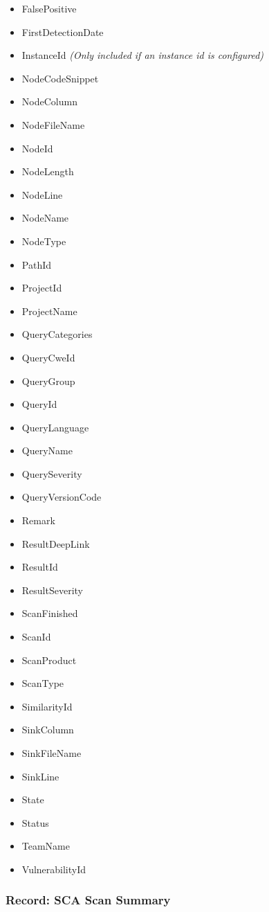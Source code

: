 \begin{itemize}
    \item FalsePositive
    \item FirstDetectionDate
    \item InstanceId \textit{(Only included if an instance id is configured)}
    \item NodeCodeSnippet
    \item NodeColumn
    \item NodeFileName
    \item NodeId
    \item NodeLength
    \item NodeLine
    \item NodeName
    \item NodeType
    \item PathId
    \item ProjectId
    \item ProjectName
    \item QueryCategories
    \item QueryCweId
    \item QueryGroup
    \item QueryId
    \item QueryLanguage
    \item QueryName
    \item QuerySeverity
    \item QueryVersionCode
    \item Remark
    \item ResultDeepLink
    \item ResultId
    \item ResultSeverity
    \item ScanFinished
    \item ScanId
    \item ScanProduct
    \item ScanType
    \item SimilarityId
    \item SinkColumn
    \item SinkFileName
    \item SinkLine
    \item State
    \item Status
    \item TeamName
    \item VulnerabilityId
\end{itemize}

\subsubsection{Record: SCA Scan Summary}

